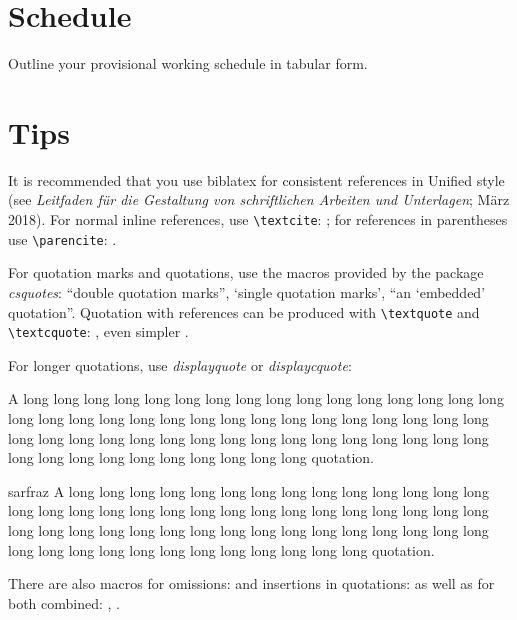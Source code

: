 \documentclass[naustrian,english]{univie-ling-expose}
\begin{document}
\section{Schedule}\label{sec:schedule}

Outline your provisional working schedule in tabular form.


\section{Tips}

It is recommended that you use \textsf{biblatex} for consistent references in Unified style
(see \foreignlanguage{naustrian}{\emph{Leitfaden für die Gestaltung von schriftlichen Arbeiten und Unterlagen}; März 2018}).
For normal inline references, use \verb|\textcite|: \textcite[22]{sarfraz}; for references in parentheses use \verb|\parencite|: \parencite{sarfraz}.

For quotation marks and quotations, use the macros provided by the package \emph{csquotes}: \enquote{double quotation marks},
\enquote*{single quotation marks}, \enquote{an \enquote{embedded} quotation}. Quotation with references can be produced with
\verb|\textquote| and \verb|\textcquote|: , even simpler
.

For longer quotations, use \emph{displayquote} or \emph{displaycquote}:

\begin{displayquote}
	A long long long long long long long long long long long long long long long long long long
	long long long long long long long long long long long long long long long long long long long long
	long long long long long long long long long long long long long long long long long long long long
	quotation.
\end{displayquote}

\begin{displaycquote}[246]{sarfraz}
	A long long long long long long long long long long long long long long long long long long
	long long long long long long long long long long long long long long long long long long long long
	long long long long long long long long long long long long long long long long long long long long
	quotation.
\end{displaycquote}
%
There are also macros for omissions: \textelp{} and insertions in quotations:  as well as for both combined:
, .
\end{document}
